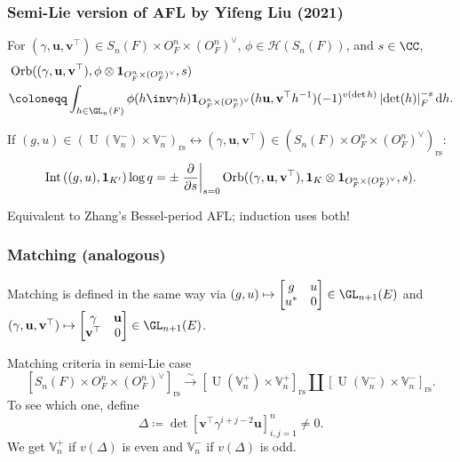 \documentclass[11pt]{beamer}
\DeclareMathOperator{\Int}{Int}
\DeclareMathOperator{\Orb}{Orb}
\DeclareMathOperator{\U}{U}
\newcommand{\HH}{\mathcal{H}}
\newcommand{\VV}{\mathbb{V}}
\renewcommand{\OO}{O}
\newcommand{\guv}{{(\gamma, \uu, \vv^\top)}}
\newcommand{\oneV}{\mathbf{1}_{\OO_F^n \times (\OO_F^n)^\vee}}
\newcommand{\rs}{_{\text{rs}}}
\newcommand{\uu}{\mathbf{u}}
\newcommand{\vv}{\mathbf{v}}
\begin{document}
\begin{frame}
  \frametitle{Semi-Lie version of AFL by Yifeng Liu (2021)}
  \begin{definition}
  For $\guv \in S_n(F) \times \OO_F^n \times (\OO_F^n)^\vee$,
  $\phi \in \HH(S_n(F))$, and $s \in \CC$,
  \begin{align*}
    & \Orb((\gamma, \uu, \vv^\top), \phi \otimes \oneV, s) \\
    &\coloneqq \int_{h \in \GL_n(F)} \phi(h\inv \gamma h) \oneV(h \uu, \vv^\top h^{-1})
      (-1)^{v(\det h)} \left\lvert \det(h) \right\rvert_F^{-s} \odif h.
  \end{align*}
  \end{definition}

  \begin{theorem}
    If $(g, u) \in (\U(\VV_n^-) \times \VV_n^-)\rs \longleftrightarrow
      (\gamma, \uu, \vv^\top) \in (S_n(F) \times \OO_F^n \times (\OO_F^n)^\vee)\rs$:
    \[
      \Int\left( (g,u), \mathbf{1}_{K'} \right) \log q
      = \pm \left. \pdv{}{s} \right\rvert_{s=0}
      \Orb(\guv, \mathbf{1}_K \otimes \oneV, s).
    \]
  \end{theorem}
  Equivalent to Zhang's Bessel-period AFL; induction uses both!
\end{frame}

\begin{frame}
  \frametitle{Matching (analogous)}
  Matching is defined in the same way via
  $(g,u) \mapsto \begin{bmatrix} g & u \\ u^\ast & 0 \end{bmatrix} \in \GL_{n+1}(E)$
  and $\guv \mapsto \begin{bmatrix} \gamma & \uu \\ \vv^\top & 0 \end{bmatrix} \in \GL_{n+1}(E)$.

  \begin{block}{Matching criteria in semi-Lie case}
  \[ [S_n(F) \times \OO_F^n \times (\OO_F^n)^\vee]\rs \xrightarrow{\sim} [\U(\VV_n^+) \times \VV_n^+]\rs \amalg [\U(\VV_n^-) \times \VV_n^-]\rs. \]
  To see which one, define
  \[ \Delta \coloneqq \det \left[ \vv^\top \gamma^{i+j-2} \uu \right]_{i,j=1}^n \neq 0. \]
  We get $\VV_n^+$ if $v(\Delta)$ is even
  and $\VV_n^-$ if $v(\Delta)$ is odd.
  \end{block}
\end{frame}
\end{document}
